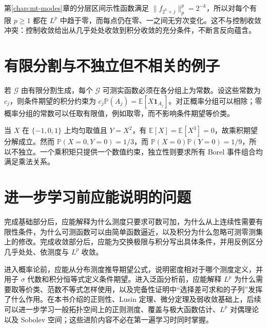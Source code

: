 第\ref{chap:mt-modes}章的分层区间示性函数满足 $\|f_{2^k+j}\|_p^p=2^{-k}$，所以对每个有限 $p\geq1$ 都在 $L^p$ 中趋于零，而每点仍在零、一之间无穷次变化。这不与控制收敛冲突：控制收敛给出从几乎处处收敛到积分收敛的充分条件，不断言反向蕴含。

\section{有限分割与不独立但不相关的例子}
若 $\mathcal G$ 由有限分割生成，每个 $\mathcal G$ 可测实函数必须在各分组上为常数。设这些常数为 $c_j$，则条件期望的积分约束为
$c_j\mathbb P(A_j)=\mathbb E[X\mathbf1_{A_j}]$。对正概率分组可以相除；零概率分组的常数可以任取有限值，例如取零，而不影响条件期望等价类。

当 $X$ 在 $\{-1,0,1\}$ 上均匀取值且 $Y=X^2$，有 $\mathbb E[X]=\mathbb E[X^3]=0$，故乘积期望分解成立。然而
$\mathbb P(X=0,Y=0)=1/3$，而 $\mathbb P(X=0)\mathbb P(Y=0)=1/9$，所以不独立。一个乘积矩只提供一个数值约束，独立性则要求所有 Borel 事件组合均满足乘法关系。

\section{进一步学习前应能说明的问题}
完成基础部分后，应能解释为什么测度只要求可数可加，为什么从上连续性需要有限性条件，为什么可测函数可以由简单函数逼近，以及积分为什么忽略可测零测集上的修改。完成收敛部分后，应能为交换极限与积分写出具体条件，并用反例区分几乎处处、依测度与 $L^p$ 收敛。

进入概率论前，应能从分布测度推导期望公式，说明密度相对于哪个测度定义，并用子 $\sigma$ 代数和积分恒等式定义条件期望。进入泛函分析前，应能解释 $L^p$ 为什么需要取等价类、范数不等式怎样使用，以及完备性证明中“选择差可求和的子列”发挥了什么作用。在本书介绍的正则性、Lusin 定理、微分定理及弱收敛基础上，后续可以进一步学习一般拓扑空间上的正则测度、覆盖与极大函数估计、$L^p$ 对偶理论以及 Sobolev 空间；这些进阶内容不必在第一遍学习时同时掌握。

